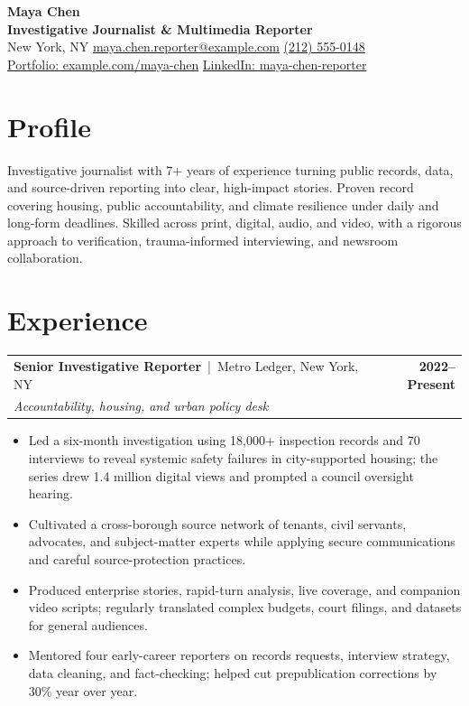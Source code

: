 \documentclass[10pt,letterpaper]{article}
\makeatletter
\newcommand{\contactsep}{\hspace{0.55em}\textcolor{muted}{\textbar}\hspace{0.55em}}
\newcommand{\role}[4]{%
  \begin{tabularx}{\textwidth}{@{}>{\raggedright\arraybackslash}Xr@{}}
    \textbf{#1} \textcolor{muted}{\,|\, #2} & \textbf{#3} \\
    \textit{#4} &
  \end{tabularx}\vspace{-3pt}
}
\makeatother
\begin{document}
\begin{center}
  {\fontsize{25}{28}\selectfont\bfseries Maya Chen}\\[-1pt]
  {\large\color{accent}\textbf{Investigative Journalist \& Multimedia Reporter}}\\[4pt]
  \small
  New York, NY
  \contactsep \href{mailto:maya.chen.reporter@example.com}{maya.chen.reporter@example.com}
  \contactsep \href{tel:+12125550148}{(212) 555-0148}\\[1pt]
  \href{https://example.com/maya-chen}{Portfolio: example.com/maya-chen}
  \contactsep \href{https://www.linkedin.com/in/maya-chen-reporter}{LinkedIn: maya-chen-reporter}
\end{center}

\vspace{-4pt}
\section*{Profile}
Investigative journalist with 7+ years of experience turning public records, data, and source-driven reporting into clear, high-impact stories. Proven record covering housing, public accountability, and climate resilience under daily and long-form deadlines. Skilled across print, digital, audio, and video, with a rigorous approach to verification, trauma-informed interviewing, and newsroom collaboration.

\section*{Experience}
\role{Senior Investigative Reporter}{Metro Ledger, New York, NY}{2022--Present}{Accountability, housing, and urban policy desk}
\begin{itemize}
  \item Led a six-month investigation using 18,000+ inspection records and 70 interviews to reveal systemic safety failures in city-supported housing; the series drew 1.4 million digital views and prompted a council oversight hearing.
  \item Cultivated a cross-borough source network of tenants, civil servants, advocates, and subject-matter experts while applying secure communications and careful source-protection practices.
  \item Produced enterprise stories, rapid-turn analysis, live coverage, and companion video scripts; regularly translated complex budgets, court filings, and datasets for general audiences.
  \item Mentored four early-career reporters on records requests, interview strategy, data cleaning, and fact-checking; helped cut prepublication corrections by 30\% year over year.
\end{itemize}
\end{document}
